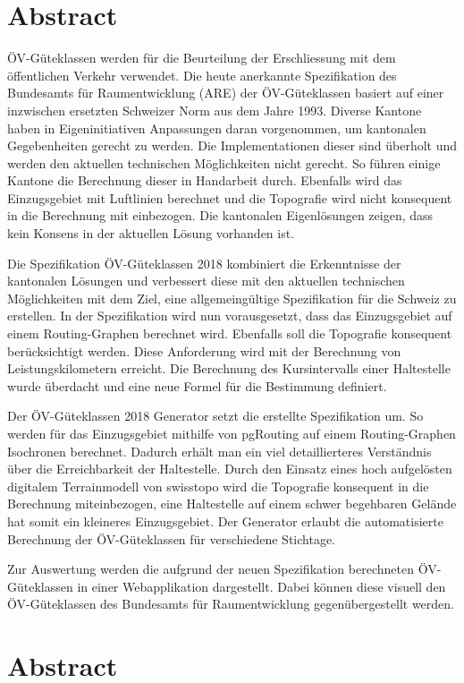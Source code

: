 
\chapter*{Abstract}
ÖV-Güteklassen werden für die Beurteilung der Erschliessung mit dem öffentlichen Verkehr verwendet.
Die heute anerkannte Spezifikation des Bundesamts für Raumentwicklung (ARE) der ÖV-Güteklassen basiert auf einer inzwischen ersetzten Schweizer Norm aus dem Jahre 1993.
Diverse Kantone haben in Eigeninitiativen Anpassungen daran vorgenommen, um kantonalen Gegebenheiten gerecht zu werden.
Die Implementationen dieser sind überholt und werden den aktuellen technischen Möglichkeiten nicht gerecht.
So führen einige Kantone die Berechnung dieser in Handarbeit durch.
Ebenfalls wird das Einzugsgebiet mit Luftlinien berechnet und die Topografie wird nicht konsequent in die Berechnung mit einbezogen.
Die kantonalen Eigenlösungen zeigen, dass kein Konsens in der aktuellen Lösung vorhanden ist.

Die Spezifikation ÖV-Güteklassen 2018 kombiniert die Erkenntnisse der kantonalen Lösungen und verbessert diese mit den aktuellen technischen Möglichkeiten mit dem Ziel, eine allgemeingültige Spezifikation für die Schweiz zu erstellen.
In der Spezifikation wird nun vorausgesetzt, dass das Einzugsgebiet auf einem Routing-Graphen berechnet wird.
Ebenfalls soll die Topografie konsequent berücksichtigt werden.
Diese Anforderung wird mit der Berechnung von Leistungskilometern erreicht.
Die Berechnung des Kursintervalls einer Haltestelle wurde überdacht und eine neue Formel für die Bestimmung definiert.

Der ÖV-Güteklassen 2018 Generator setzt die erstellte Spezifikation um.
So werden für das Einzugsgebiet mithilfe von pgRouting auf einem Routing-Graphen Isochronen berechnet.
Dadurch erhält man ein viel detaillierteres Verständnis über die Erreichbarkeit der Haltestelle.
Durch den Einsatz eines hoch aufgelösten digitalem Terrainmodell von swisstopo wird die Topografie konsequent in die Berechnung miteinbezogen, eine Haltestelle auf einem schwer begehbaren Gelände hat somit ein kleineres Einzugsgebiet.
Der Generator erlaubt die automatisierte Berechnung der ÖV-Güteklassen für verschiedene Stichtage.

Zur Auswertung werden die aufgrund der neuen Spezifikation berechneten ÖV-Güteklassen in einer Webapplikation dargestellt.
Dabei können diese visuell den ÖV-Güteklassen des Bundesamts für Raumentwicklung gegenübergestellt werden.




\cleardoublepage

\chapter*{Abstract}

